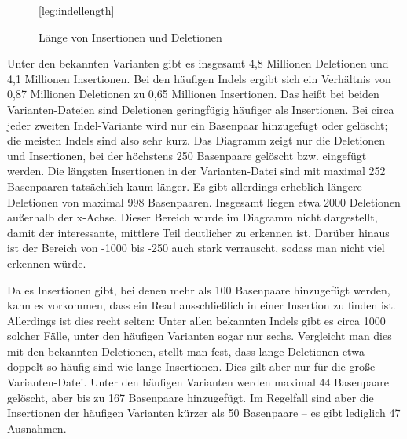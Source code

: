 \begin{figure}[h]
\pgfplotsset{footnotesize,width=12cm,compat=1.8}
\begin{center}
\ref*{leg:indellength}

\end{center}

\caption{Länge von Insertionen und Deletionen}
\label{fig:stats:indellength}

\end{figure}

Unter den bekannten Varianten gibt es insgesamt 4,8 Millionen Deletionen und 4,1 Millionen Insertionen. Bei den häufigen Indels ergibt sich ein Verhältnis von 0,87 Millionen Deletionen zu 0,65 Millionen Insertionen. Das heißt bei beiden Varianten-Dateien sind Deletionen geringfügig häufiger als Insertionen. Bei circa jeder zweiten Indel-Variante wird nur ein Basenpaar hinzugefügt oder gelöscht; die meisten Indels sind also sehr kurz. Das Diagramm zeigt nur die Deletionen und Insertionen, bei der höchstens 250 Basenpaare gelöscht bzw. eingefügt werden. Die längsten Insertionen in der Varianten-Datei sind mit maximal 252 Basenpaaren tatsächlich kaum länger. Es gibt allerdings erheblich längere Deletionen von maximal 998 Basenpaaren. Insgesamt liegen etwa 2000 Deletionen außerhalb der x-Achse. Dieser Bereich wurde im Diagramm nicht dargestellt, damit der interessante, mittlere Teil deutlicher zu erkennen ist. Darüber hinaus ist der Bereich von -1000 bis -250 auch stark verrauscht, sodass man nicht viel erkennen würde.

Da es Insertionen gibt, bei denen mehr als 100 Basenpaare hinzugefügt werden, kann es vorkommen, dass ein Read ausschließlich in einer Insertion zu finden ist. Allerdings ist dies recht selten: Unter allen bekannten Indels gibt es circa 1000 solcher Fälle, unter den häufigen Varianten sogar nur sechs. Vergleicht man dies mit den bekannten Deletionen, stellt man fest, dass lange Deletionen etwa doppelt so häufig sind wie lange Insertionen. Dies gilt aber nur für die große Varianten-Datei. Unter den häufigen Varianten werden maximal 44 Basenpaare gelöscht, aber bis zu 167 Basenpaare hinzugefügt. Im Regelfall sind aber die Insertionen der häufigen Varianten kürzer als 50 Basenpaare -- es gibt lediglich 47 Ausnahmen.


